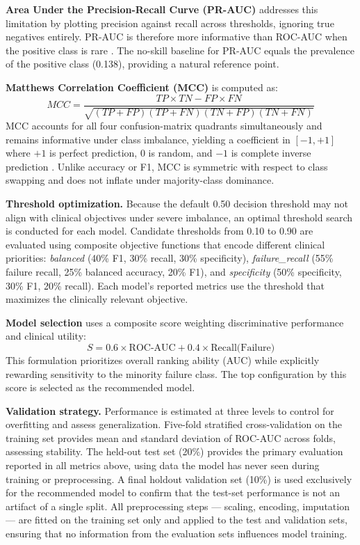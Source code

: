 \documentclass[12pt]{article}
\begin{document}
\textbf{Area Under the Precision-Recall Curve (PR-AUC)} addresses this limitation by plotting precision against recall across thresholds, ignoring true negatives entirely. PR-AUC is therefore more informative than ROC-AUC when the positive class is rare \citep{davis2006relationship}. The no-skill baseline for PR-AUC equals the prevalence of the positive class (0.138), providing a natural reference point.

\textbf{Matthews Correlation Coefficient (MCC)} is computed as:
\[
MCC = \frac{TP \times TN - FP \times FN}{\sqrt{(TP+FP)(TP+FN)(TN+FP)(TN+FN)}}
\]
MCC accounts for all four confusion-matrix quadrants simultaneously and remains informative under class imbalance, yielding a coefficient in $[-1, +1]$ where $+1$ is perfect prediction, $0$ is random, and $-1$ is complete inverse prediction \citep{chicco2020advantages}. Unlike accuracy or F1, MCC is symmetric with respect to class swapping and does not inflate under majority-class dominance.

\textbf{Threshold optimization.} Because the default 0.50 decision threshold may not align with clinical objectives under severe imbalance, an optimal threshold search is conducted for each model. Candidate thresholds from 0.10 to 0.90 are evaluated using composite objective functions that encode different clinical priorities: \textit{balanced} (40\% F1, 30\% recall, 30\% specificity), \textit{failure\_recall} (55\% failure recall, 25\% balanced accuracy, 20\% F1), and \textit{specificity} (50\% specificity, 30\% F1, 20\% recall). Each model's reported metrics use the threshold that maximizes the clinically relevant objective.

\textbf{Model selection} uses a composite score weighting discriminative performance and clinical utility:
\[
S = 0.6 \times \text{ROC-AUC} + 0.4 \times \text{Recall(Failure)}
\]
This formulation prioritizes overall ranking ability (AUC) while explicitly rewarding sensitivity to the minority failure class. The top configuration by this score is selected as the recommended model.

\textbf{Validation strategy.} Performance is estimated at three levels to control for overfitting and assess generalization. Five-fold stratified cross-validation on the training set provides mean and standard deviation of ROC-AUC across folds, assessing stability. The held-out test set (20\%) provides the primary evaluation reported in all metrics above, using data the model has never seen during training or preprocessing. A final holdout validation set (10\%) is used exclusively for the recommended model to confirm that the test-set performance is not an artifact of a single split. All preprocessing steps --- scaling, encoding, imputation --- are fitted on the training set only and applied to the test and validation sets, ensuring that no information from the evaluation sets influences model training.
\end{document}
